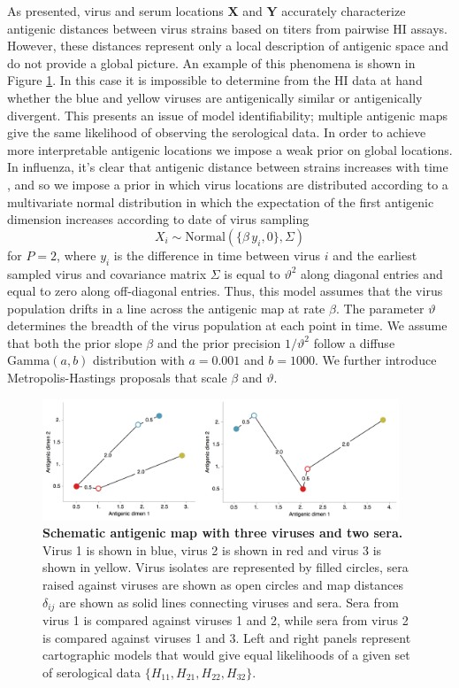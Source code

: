\documentclass[11pt,oneside,letterpaper]{article}
\newcommand{\driftsd}{\vartheta}					%
\begin{document}
As presented, virus and serum locations $\mathbf{X}$ and $\mathbf{Y}$ accurately characterize antigenic distances between virus strains based on titers from pairwise HI assays.
However, these distances represent only a local description of antigenic space and do not provide a global picture.
An example of this phenomena is shown in Figure \ref{schematic_map}.
In this case it is impossible to determine from the HI data at hand whether the blue and yellow viruses are antigenically similar or antigenically divergent. 
This presents an issue of model identifiability; multiple antigenic maps give the same likelihood of observing the serological data.
In order to achieve more interpretable antigenic locations we impose a weak prior on global locations.
In influenza, it's clear that antigenic distance between strains increases with time \cite{Smith04,Cai10}, and so we impose a prior in which virus locations are distributed according to a multivariate normal distribution in which the expectation of the first antigenic dimension increases according to date of virus sampling
\begin{equation} 
	X_{i} \sim \mbox{Normal}( \{\beta \, y_i, 0\}, \Sigma )
\end{equation}
for $P=2$, where $y_i$ is the difference in time between virus $i$ and the earliest sampled virus and covariance matrix $\Sigma$ is equal to $\driftsd^2$ along diagonal entries and equal to zero along off-diagonal entries.
Thus, this model assumes that the virus population drifts in a line across the antigenic map at rate $\beta$.
The parameter $\driftsd$ determines the breadth of the virus population at each point in time.
We assume that both the prior slope $\beta$ and the prior precision $1/\driftsd^2$ follow a diffuse $\mbox{Gamma}(a, b)$ distribution with $a=0.001$ and $b=1000$.
We further introduce Metropolis-Hastings proposals that scale $\beta$ and $\driftsd$.

\begin{figure}[tb]
	\centering		
	\includegraphics[width=0.95\textwidth]{figures/schematic_map}
	\caption{\textbf{Schematic antigenic map with three viruses and two sera.} 
	Virus 1 is shown in blue, virus 2 is shown in red and virus 3 is shown in yellow.
	Virus isolates are represented by filled circles, sera raised against viruses are shown as open circles and map distances $\delta_{ij}$ are shown as solid lines connecting viruses and sera.
	Sera from virus 1 is compared against viruses 1 and 2, while sera from virus 2 is compared against viruses 1 and 3.
	Left and right panels represent cartographic models that would give equal likelihoods of a given set of serological data $\{H_{11},H_{21},H_{22},H_{32}\}$.
	} 
	\label{schematic_map} 
\end{figure}
\end{document}
